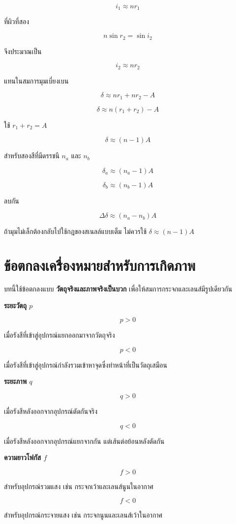 \[
i_1\approx nr_1
\]

ที่ผิวที่สอง

\[
n\sin r_2=\sin i_2
\]

จึงประมาณเป็น

\[
i_2\approx nr_2
\]

แทนในสมการมุมเบี่ยงเบน

\[
\delta\approx nr_1+nr_2-A
\]

\[
\delta\approx n(r_1+r_2)-A
\]

ใช้ $r_1+r_2=A$

\begin{tcolorbox}[title={มุมเบี่ยงเบนของปริซึมบาง}]
\[
\boxed{\delta\approx(n-1)A}
\]
\end{tcolorbox}

สำหรับสองสีที่มีดรรชนี $n_a$ และ $n_b$

\[
\delta_a\approx(n_a-1)A
\]

\[
\delta_b\approx(n_b-1)A
\]

ลบกัน

\begin{tcolorbox}[title={มุมแยกของสองสีในปริซึมบาง}]
\[
\boxed{\Delta\delta\approx(n_a-n_b)A}
\]
\end{tcolorbox}

ถ้ามุมไม่เล็กต้องกลับไปใช้กฎของสเนลล์แบบเต็ม ไม่ควรใช้ $\delta\approx(n-1)A$

\section{ข้อตกลงเครื่องหมายสำหรับการเกิดภาพ}

บทนี้ใช้ข้อตกลงแบบ \textbf{วัตถุจริงและภาพจริงเป็นบวก} เพื่อให้สมการกระจกและเลนส์มีรูปเดียวกัน

\begin{tcolorbox}[title={ข้อตกลงเครื่องหมายที่ใช้ในบทนี้}]
\textbf{ระยะวัตถุ $p$}

\[
p>0
\]

เมื่อรังสีที่เข้าสู่อุปกรณ์แยกออกมาจากวัตถุจริง

\[
p<0
\]

เมื่อรังสีที่เข้าสู่อุปกรณ์กำลังรวมเข้าหาจุดซึ่งทำหน้าที่เป็นวัตถุเสมือน

\medskip
\textbf{ระยะภาพ $q$}

\[
q>0
\]

เมื่อรังสีหลังออกจากอุปกรณ์ตัดกันจริง

\[
q<0
\]

เมื่อรังสีหลังออกจากอุปกรณ์แยกจากกัน แต่เส้นต่อย้อนหลังตัดกัน

\medskip
\textbf{ความยาวโฟกัส $f$}

\[
f>0
\]

สำหรับอุปกรณ์รวมแสง เช่น กระจกเว้าและเลนส์นูนในอากาศ

\[
f<0
\]

สำหรับอุปกรณ์กระจายแสง เช่น กระจกนูนและเลนส์เว้าในอากาศ
\end{tcolorbox}

